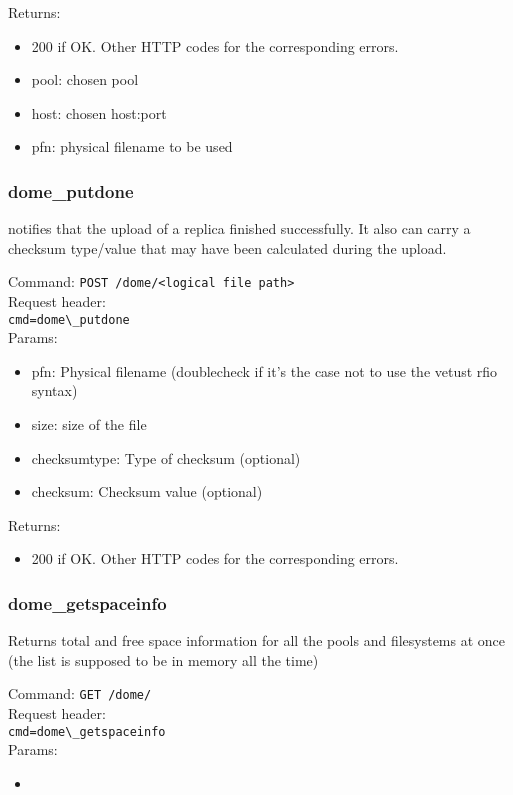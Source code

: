 \documentclass[a4paper,10pt]{scrreprt}
\begin{document}
Returns:
\begin{itemize}
 \item 200 if OK. Other HTTP codes for the corresponding errors.
 \item pool: chosen pool
 \item host: chosen host:port
 \item pfn: physical filename to be used
\end{itemize}

\subsubsection{dome\_putdone}
notifies that the upload of a replica finished successfully. It also can carry a checksum type/value that may have been calculated during the upload.

Command:
\lstinline"POST /dome/<logical file path>"\\
Request header:\\
\lstinline"cmd=dome\_putdone"\\

Params:
\begin{itemize}
 \item pfn: Physical filename (doublecheck if it's the case not to use the vetust rfio syntax)
 \item size: size of the file
 \item checksumtype: Type of checksum (optional)
 \item checksum: Checksum value (optional)
\end{itemize}

Returns:
\begin{itemize}
 \item 200 if OK. Other HTTP codes for the corresponding errors.
\end{itemize}

\subsubsection{dome\_getspaceinfo}
Returns total and free space information for all the pools and filesystems at once (the list is supposed to be in memory all the time)

Command:
\lstinline"GET /dome/"\\
Request header:\\
\lstinline"cmd=dome\_getspaceinfo"\\
Params:
\begin{itemize}
 \item 
\end{itemize}
\end{document}
